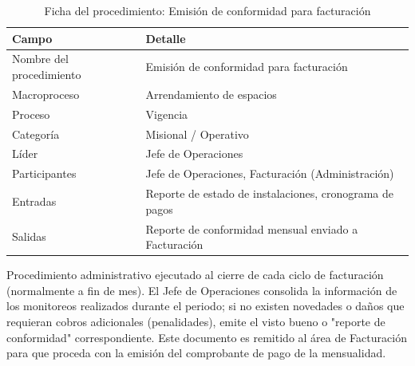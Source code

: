 \documentclass[11pt, a4paper, oneside]{report}
\begin{document}
\begin{table}[H]
\centering\small
\renewcommand{\arraystretch}{1.25}
\setlength{\tabcolsep}{6pt}
\begin{tabularx}{\textwidth}{|>{\raggedright\arraybackslash}p{}|>{\raggedright\arraybackslash}X|}
\hline
\rowcolor{upeu_mid}
\color{white}\bfseries Campo & \color{white}\bfseries Detalle \\ \hline
\rowcolor{gray!10}
Nombre del procedimiento & Emisión de conformidad para facturación \\ \hline
\rowcolor{gray!10}
Macroproceso & Arrendamiento de espacios \\ \hline
Proceso & Vigencia \\ \hline
\rowcolor{gray!10}
Categoría & Misional / Operativo \\ \hline
Líder & Jefe de Operaciones \\ \hline
\rowcolor{gray!10}
Participantes & Jefe de Operaciones, Facturación (Administración) \\ \hline
Entradas & Reporte de estado de instalaciones, cronograma de pagos \\ \hline
\rowcolor{gray!10}
Salidas & Reporte de conformidad mensual enviado a Facturación \\ \hline
\end{tabularx}
\caption{Ficha del procedimiento: Emisión de conformidad para facturación}
\end{table}

Procedimiento administrativo ejecutado al cierre de cada ciclo de facturación (normalmente a fin de mes). El Jefe de Operaciones consolida la información de los monitoreos realizados durante el periodo; si no existen novedades o daños que requieran cobros adicionales (penalidades), emite el visto bueno o "reporte de conformidad" correspondiente. Este documento es remitido al área de Facturación para que proceda con la emisión del comprobante de pago de la mensualidad.
\end{document}
